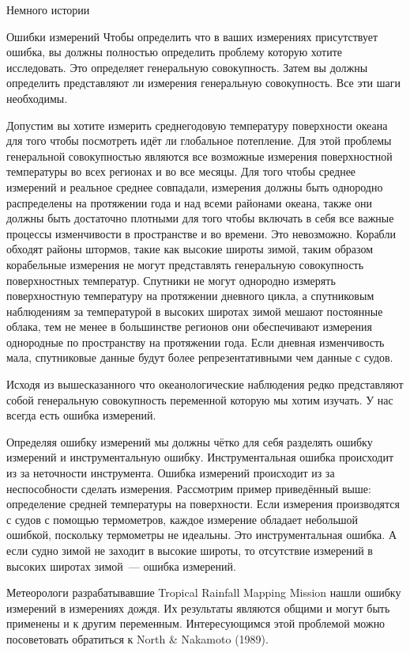 \begin{chapter}{Немного истории}
\begin{section}{Ошибки измерений}
Чтобы определить что в ваших измерениях присутствует ошибка, вы должны
полностью определить проблему которую хотите исследовать. Это
определяет генеральную совокупность. Затем вы должны определить
представляют ли измерения генеральную совокупность. Все эти шаги
необходимы.

Допустим вы хотите измерить среднегодовую температуру поверхности
океана для того чтобы посмотреть идёт ли глобальное потепление. Для
этой проблемы генеральной совокупностью являются все возможные
измерения поверхностной температуры во всех регионах и во все
месяцы. Для того чтобы среднее измерений и реальное среднее совпадали,
измерения должны быть однородно распределены на протяжении года и над
всеми районами океана, также они должны быть достаточно плотными для
того чтобы включать в себя все важные процессы изменчивости в
пространстве и во времени. Это невозможно. Корабли обходят районы
штормов, такие как высокие широты зимой, таким образом корабельные
измерения не могут представлять генеральную совокупность поверхностных
температур. Спутники не могут однородно измерять поверхностную
температуру на протяжении дневного цикла, а спутниковым наблюдениям за
температурой в высоких широтах зимой мешают постоянные облака, тем не
менее в большинстве регионов они обеспечивают измерения однородные по
пространству на протяжении года. Если дневная изменчивость мала,
спутниковые данные будут более репрезентативными чем данные с судов.

Исходя из вышесказанного что океанологические наблюдения редко
представляют собой генеральную совокупность переменной которую мы
хотим изучать. У нас всегда есть ошибка измерений.

Определяя ошибку измерений мы должны чётко для себя разделять ошибку
измерений и инструментальную ошибку. Инструментальная ошибка
происходит из за неточности инструмента. Ошибка измерений происходит
из за неспособности сделать измерения. Рассмотрим пример приведённый
выше: определение средней температуры на поверхности. Если измерения
производятся с судов с помощью термометров, каждое измерение обладает
небольшой ошибкой, поскольку термометры не идеальны. Это
инструментальная ошибка. А если судно зимой не заходит в высокие
широты, то отсутствие измерений в высоких широтах зимой~--- ошибка
измерений.

Метеорологи разрабатывавшие Tropical Rainfall Mapping Mission нашли
ошибку измерений в измерениях дождя. Их результаты являются общими и
могут быть применены и к другим переменным. Интересующимся этой
проблемой можно посоветовать обратиться к North \& Nakamoto (1989).


\end{section}
\end{chapter}
